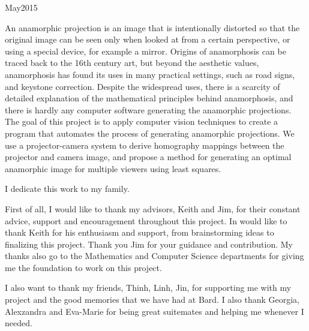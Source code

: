 \documentclass[11pt, oneside, reqno]{book}
\begin{document}
    {May}{2015}


\abstr

An anamorphic projection is an image that is intentionally distorted so that the original image can be seen only when looked at from a certain perspective, or using a special device, for example a mirror. Origins of anamorphosis can be traced back to the 16th century art, but beyond the aesthetic values, anamorphosis has found its uses in many practical settings, such as road signs, and keystone correction. Despite the widespread uses, there is a scarcity of detailed explanation of the mathematical principles behind anamorphosis, and there is hardly any computer software generating the anamorphic projections. The goal of this project is to apply computer vision techniques to create a program that automates the process of generating anamorphic projections. We use a projector-camera system to derive homography mappings between the projector and camera image, and propose a method for generating an optimal anamorphic image for multiple viewers using least squares. 

\tableofcontents

\listoffigures

\dedic

\begin{center}
\Large I dedicate this work to my family.
\end{center}


\acknowl

First of all, I would like to thank my advisors, Keith and Jim, for their constant advice, support and encouragement throughout this project.
In would like to thank Keith for his enthusiasm and support, from brainstorming ideas to finalizing this project. Thank you Jim for your guidance and contribution.
My thanks also go to the Mathematics and Computer Science departments for giving me the foundation to work on this project. 

I also want to thank my friends, Thinh, Linh, Jin, for supporting me with my project and the good memories that we have had at Bard. I also thank Georgia, Alexzandra and Eva-Marie for being great suitemates and helping me whenever I needed. 
\end{document}
